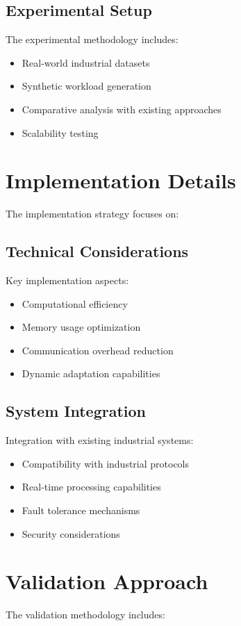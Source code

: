 \subsection{Experimental Setup}
The experimental methodology includes:
\begin{itemize}
    \item Real-world industrial datasets
    \item Synthetic workload generation
    \item Comparative analysis with existing approaches
    \item Scalability testing
\end{itemize}

\section{Implementation Details}
The implementation strategy focuses on:

\subsection{Technical Considerations}
Key implementation aspects:
\begin{itemize}
    \item Computational efficiency
    \item Memory usage optimization
    \item Communication overhead reduction
    \item Dynamic adaptation capabilities
\end{itemize}

\subsection{System Integration}
Integration with existing industrial systems:
\begin{itemize}
    \item Compatibility with industrial protocols
    \item Real-time processing capabilities
    \item Fault tolerance mechanisms
    \item Security considerations
\end{itemize}

\section{Validation Approach}
The validation methodology includes:

